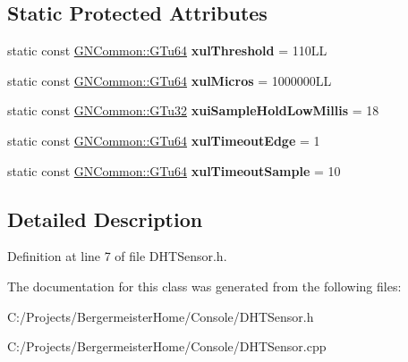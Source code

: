 \subsection*{Static Protected Attributes}
\begin{DoxyCompactItemize}
\item 
\mbox{\label{class_console_1_1_g_tc_d_h_t_sensor_ae039fda43f1f4fcb89f0dcd42a9f8536}} 
static const \mbox{\hyperlink{namespace_g_n_common_a01e8527dabf7ab4f123156b0701945eb}{G\+N\+Common\+::\+G\+Tu64}} {\bfseries xul\+Threshold} = 110\+LL
\item 
\mbox{\label{class_console_1_1_g_tc_d_h_t_sensor_abe17cac05439ef8b1305bf2800b34806}} 
static const \mbox{\hyperlink{namespace_g_n_common_a01e8527dabf7ab4f123156b0701945eb}{G\+N\+Common\+::\+G\+Tu64}} {\bfseries xul\+Micros} = 1000000\+LL
\item 
\mbox{\label{class_console_1_1_g_tc_d_h_t_sensor_a7817e1d85a7235c9d7cb75cee501a718}} 
static const \mbox{\hyperlink{namespace_g_n_common_ae5485474bc8f23e462e920a17b377b53}{G\+N\+Common\+::\+G\+Tu32}} {\bfseries xui\+Sample\+Hold\+Low\+Millis} = 18
\item 
\mbox{\label{class_console_1_1_g_tc_d_h_t_sensor_a23fdf91d2ac3beef278a969e63bcb91a}} 
static const \mbox{\hyperlink{namespace_g_n_common_a01e8527dabf7ab4f123156b0701945eb}{G\+N\+Common\+::\+G\+Tu64}} {\bfseries xul\+Timeout\+Edge} = 1
\item 
\mbox{\label{class_console_1_1_g_tc_d_h_t_sensor_a3e60c98618191a61bddfe22791840ad2}} 
static const \mbox{\hyperlink{namespace_g_n_common_a01e8527dabf7ab4f123156b0701945eb}{G\+N\+Common\+::\+G\+Tu64}} {\bfseries xul\+Timeout\+Sample} = 10
\end{DoxyCompactItemize}


\subsection{Detailed Description}


Definition at line 7 of file D\+H\+T\+Sensor.\+h.



The documentation for this class was generated from the following files\+:\begin{DoxyCompactItemize}
\item 
C\+:/\+Projects/\+Bergermeister\+Home/\+Console/D\+H\+T\+Sensor.\+h\item 
C\+:/\+Projects/\+Bergermeister\+Home/\+Console/D\+H\+T\+Sensor.\+cpp\end{DoxyCompactItemize}
